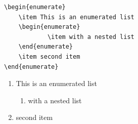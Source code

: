 \documentclass[11pt]{beamer}
\begin{document}
\begin{frame}[fragile]
\begin{itemize}
	\begin{verbatim}
\begin{enumerate}
	\item This is an enumerated list
	\begin{enumerate}
			\item with a nested list
	\end{enumerate}
	\item second item
\end{enumerate}
\end{verbatim}
\begin{enumerate}
	\item This is an enumerated list
	\begin{enumerate}
			\item with a nested list
	\end{enumerate}
	\item second item
\end{enumerate}
\end{itemize}
\end{frame}
\end{document}
